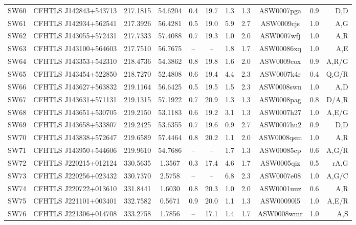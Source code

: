 \documentclass[useAMS,usenatbib,a4paper]{mn2e}
\begin{document}
\begin{center}
\begin{longtable}{lcccccccccr}
SW60 & CFHTLS J142843+543713 &  217.1815 &   54.6204 &  0.4 & 19.7 &  1.3 &  1.3 & ASW0007pga &  0.9  &  D,D   \\ 
SW61 & CFHTLS J142934+562541 &  217.3926 &   56.4281 &  0.5 & 19.0 &  5.9 &  2.7 & ASW0009cjs &  1.0  &  A,G   \\ 
SW62 & CFHTLS J143055+572431 &  217.7333 &   57.4088 &  0.7 & 19.3 &  1.0 &  2.0 & ASW0007wfj &  1.0  &  A,R   \\ 
SW63 & CFHTLS J143100+564603 &  217.7510 &   56.7675 &  --  &  --  &  1.8 &  1.7 & ASW00086xq &  1.0  &  A,E   \\ 
SW64 & CFHTLS J143353+542310 &  218.4736 &   54.3862 &  0.8 & 19.8 &  1.6 &  2.0 & ASW0009cox &  0.9  &  A,R/G   \\ 
SW65 & CFHTLS J143454+522850 &  218.7270 &   52.4808 &  0.6 & 19.4 &  4.4 &  2.3 & ASW0007k4r &  0.4  &  Q,G/R   \\ 
SW66 & CFHTLS J143627+563832 &  219.1164 &   56.6425 &  0.5 & 19.5 &  1.5 &  2.3 & ASW0008swn &  1.0  &  A,D   \\ 
SW67 & CFHTLS J143631+571131 &  219.1315 &   57.1922 &  0.7 & 20.9 &  1.3 &  1.3 & ASW0008pag &  0.8  &  D/A,R   \\ 
SW68 & CFHTLS J143651+530705 &  219.2150 &   53.1183 &  0.6 & 19.2 &  3.1 &  1.3 & ASW0007h27 &  1.0  &  A,E/G   \\ 
SW69 & CFHTLS J143658+533807 &  219.2425 &   53.6355 &  0.7 & 19.6 &  0.9 &  2.7 & ASW0007hu2 &  0.9  &  D,D   \\ 
SW70 & CFHTLS J143838+572647 &  219.6589 &   57.4464 &  0.8 & 20.2 &  1.1 &  2.0 & ASW0008qsm &  1.0  &  A,R   \\ 
SW71 & CFHTLS J143950+544606 &  219.9610 &   54.7686 &  --  &  --  &  1.7 &  1.3 & ASW00085cp &  0.6  &  A,G/R   \\ 
SW72 & CFHTLS J220215+012124 &  330.5635 &    1.3567 &  0.3 & 17.4 &  4.6 &  1.7 & ASW0005qiz &  0.5  &  rA,G   \\ 
SW73 & CFHTLS J220256+023432 &  330.7370 &    2.5758 &  --  &  --  &  6.8 &  2.3 & ASW0007e08 &  1.0  &  A,G/C   \\ 
SW74 & CFHTLS J220722+013610 &  331.8441 &    1.6030 &  0.8 & 20.3 &  1.0 &  2.0 & ASW0001uuz &  0.6  &  A,R   \\ 
SW75 & CFHTLS J221101+003401 &  332.7582 &    0.5671 &  0.9 & 20.0 &  1.1 &  1.3 & ASW00090l5 &  1.0  &  A,E/R   \\ 
SW76 & CFHTLS J221306+014708 &  333.2758 &    1.7856 &  --  & 17.1 &  1.4 &  1.7 & ASW0008wmr &  1.0  &  A,S   \\ 

\end{longtable}
\end{center}
\end{document}
